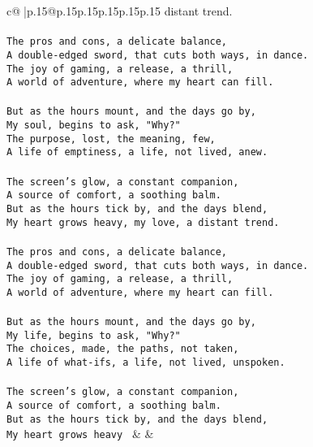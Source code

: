 \documentclass{article}
\begin{document}
{\begin{supertabular}{c@{$\;$}|p{.15\linewidth}@{}p{.15\linewidth}p{.15\linewidth}p{.15\linewidth}p{.15\linewidth}p{.15\linewidth}}
{{{distant trend.\\ \tt \\ \tt The pros and cons, a delicate balance,\\ \tt A double-edged sword, that cuts both ways, in dance.\\ \tt The joy of gaming, a release, a thrill,\\ \tt A world of adventure, where my heart can fill.\\ \tt \\ \tt But as the hours mount, and the days go by,\\ \tt My soul, begins to ask, "Why?"\\ \tt The purpose, lost, the meaning, few,\\ \tt A life of emptiness, a life, not lived, anew.\\ \tt \\ \tt The screen's glow, a constant companion,\\ \tt A source of comfort, a soothing balm.\\ \tt But as the hours tick by, and the days blend,\\ \tt My heart grows heavy, my love, a distant trend.\\ \tt \\ \tt The pros and cons, a delicate balance,\\ \tt A double-edged sword, that cuts both ways, in dance.\\ \tt The joy of gaming, a release, a thrill,\\ \tt A world of adventure, where my heart can fill.\\ \tt \\ \tt But as the hours mount, and the days go by,\\ \tt My life, begins to ask, "Why?"\\ \tt The choices, made, the paths, not taken,\\ \tt A life of what-ifs, a life, not lived, unspoken.\\ \tt \\ \tt The screen's glow, a constant companion,\\ \tt A source of comfort, a soothing balm.\\ \tt But as the hours tick by, and the days blend,\\ \tt My heart grows heavy 
	  } 
	   } 
	   } 
	 & & \\ 
 

    \theutterance {}  


\end{supertabular}}
\end{document}
